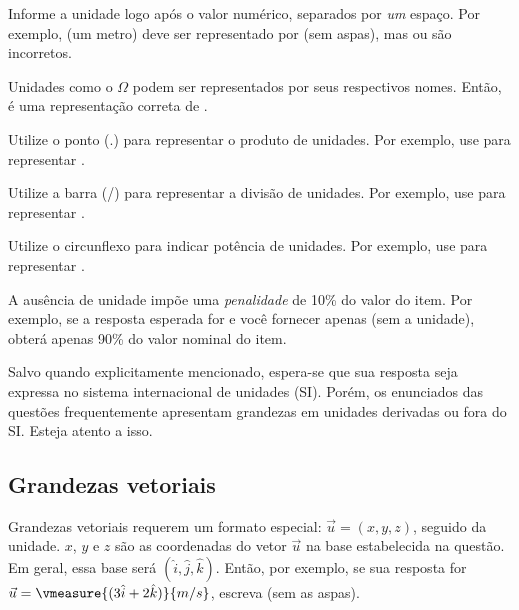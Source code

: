 \begin{compactitem}
	\item Informe a unidade logo após o valor numérico, separados por \emph{um} espaço.
	Por exemplo,  (um metro) deve ser representado por  (sem aspas), mas  ou  são incorretos.
	
	\item Unidades como o $\Omega$ podem ser representados por seus respectivos nomes.
	Então,  é uma representação correta de .
	
	\item Utilize o ponto (.) para representar o produto de unidades.
	Por exemplo, use  para representar .

	\item Utilize a barra (/) para representar a divisão de unidades.
	Por exemplo, use  para representar .
	
	\item Utilize o circunflexo para indicar potência de unidades.
	Por exemplo, use  para representar .
	
	\item A ausência de unidade impõe uma \emph{penalidade} de 10\% do valor do item.
	Por exemplo, se a resposta esperada for  e você fornecer apenas  (sem a unidade), obterá apenas 90\% do valor nominal do item.

	\item Salvo quando explicitamente mencionado, espera-se que sua resposta seja expressa no sistema internacional de unidades (SI).
	Porém, os enunciados das questões frequentemente apresentam grandezas em unidades derivadas ou fora do SI.
	Esteja atento a isso.
\end{compactitem}

\subsection*{Grandezas vetoriais}

	Grandezas vetoriais requerem um formato especial: $\vec u = (x,y,z)$, seguido da unidade.
	$x$, $y$ e $z$ são as coordenadas do vetor $\vec u$ na base estabelecida na questão.
	Em geral, essa base será $(\hat i, \hat j, \hat k)$.
	Então, por exemplo, se sua resposta for $\vec u = \vmeasure{(3\hat i + 2\hat k)}{m/s}$, escreva  (sem as aspas).

